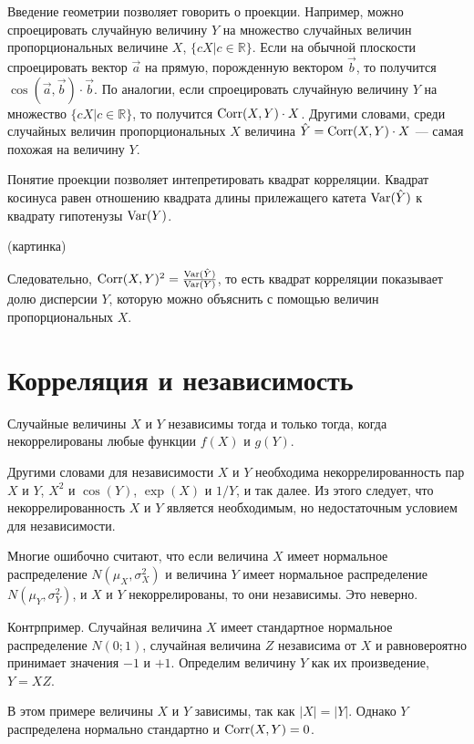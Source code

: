 \documentclass[10pt]{article}
\newcommand{\RR}{\mathbb{R}}
\begin{document}
Введение геометрии позволяет говорить о проекции. Например, можно спроецировать случайную величину $Y$ на множество случайных величин пропорциональных величине $X$, $\{cX | c\in \RR \}$. Если на обычной плоскости спроецировать вектор $\vec{a}$ на прямую, порожденную вектором $\vec{b}$, то получится $\cos(\vec{a},\vec{b})\cdot \vec{b}$. По аналогии, если спроецировать случайную величину $Y$ на множество $\{cX | c\in \RR \}$, то получится $\operatorname{Corr}(X,Y)\cdot X$. Другими словами, среди случайных величин пропорциональных $X$ величина  $\hat{Y}=\operatorname{Corr}(X,Y)\cdot X$ --- самая похожая на величину $Y$.

Понятие проекции позволяет интепретировать квадрат корреляции. Квадрат косинуса равен отношению квадрата длины прилежащего катета $\operatorname{Var}(\hat{Y})$ к квадрату гипотенузы $\operatorname{Var}(Y)$.

(картинка)

Следовательно, $\operatorname{Corr}(X,Y)^2=\frac{\operatorname{Var}(\hat{Y})}{\operatorname{Var}(Y)}$, то есть квадрат корреляции показывает долю дисперсии $Y$, которую можно объяснить с помощью величин пропорциональных $X$. 

\section{Корреляция и независимость}

\begin{theorem}
Случайные величины $X$ и $Y$ независимы тогда и только тогда, когда некоррелированы любые функции $f(X)$ и $g(Y)$.
\end{theorem}

Другими словами для независимости $X$ и $Y$ необходима некоррелированность пар $X$ и $Y$, $X^2$ и $\cos(Y)$, $\exp(X)$ и $1/Y$, и так далее. Из этого следует, что некоррелированность $X$ и $Y$ является необходимым, но недостаточным условием для независимости.

Многие ошибочно считают, что если величина $X$ имеет нормальное распределение $N(\mu_X, \sigma^2_X)$ и величина $Y$ имеет нормальное распределение $N(\mu_Y, \sigma^2_Y)$, и $X$ и $Y$ некоррелированы, то они независимы. Это неверно.

Контрпример. Случайная величина $X$ имеет стандартное нормальное распределение $N(0;1)$, случайная величина $Z$ независима от $X$ и равновероятно принимает значения $-1$ и $+1$. Определим величину $Y$ как их произведение, $Y=XZ$. 

В этом примере величины $X$ и $Y$ зависимы, так как $|X|=|Y|$. Однако $Y$ распределена нормально стандартно и $\operatorname{Corr}(X,Y)=0$.  
\end{document}

